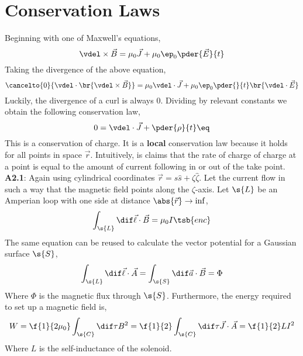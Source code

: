 \documentclass{article}
\begin{document}

\section{Conservation Laws}
Beginning with one of Maxwell's equations,
\[ \vdel \times \vec{B} = \mu_0 \vec{J} + \mu_0 \ep_0 \pder{\vec{E}}{t} \]
Taking the divergence of the above equation,
\[ \cancelto{0}{\vdel \cdot \br{\vdel \times \vec{B}}} = \mu_0 \vdel \cdot \vec{J} + \mu_0 \ep_0 \pder{}{t}\br{\vdel \cdot \vec{E}} \]
Luckily, the divergence of a curl is always $0$. Dividing by relevant constants we obtain the following conservation law,
\[ 0 = \vdel \cdot \vec{J} + \pder{\rho}{t} \eq \label{eq:conservation_charge}\]
This is a conservation of charge. It is a \textbf{local} conservation law because it holds for all points in space $\vec{r}$. Intuitively, is claims that the rate of charge of charge at a point is equal to the amount of current following in or out of the take point. \\

\textbf{A2.1}: Again using cylindrical coordinates $\vec{r} = s \hat{s} + \zeta \hat{\zeta}$. Let the current flow in such a way that the magnetic field points along the $\zeta$-axis. Let $\s{L}$ be an Amperian loop with one side at distance $\abs{\vec{r}} \to \inf$,
\[ \int_{\s{L}} \dif \vec{\ell} \cdot \vec{B} = \mu_0 I\tsb{enc} \]
The same equation can be reused to calculate the vector potential for a Gaussian surface $\s{S}$,
\[ \int_{\s{L}} \dif \vec{\ell} \cdot \vec{A} = \int_{\s{S}} \dif \vec{a} \cdot \vec{B} = \Phi \]
Where $\Phi$ is the magnetic flux through $\s{S}$. Furthermore, the energy required to set up a magnetic field is,
\[ W = \f{1}{2 \mu_0} \int_{\s{C}} \dif \tau B^2 = \f{1}{2} \int_{\s{C}} \dif \tau \vec{J} \cdot \vec{A} = \f{1}{2} L I^2 \]
Where $L$ is the self-inductance of the solenoid.
\end{document}
